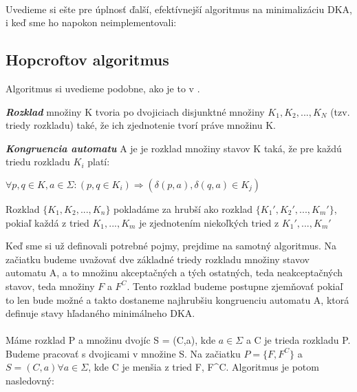 \paragraph{}
Uvedieme si ešte pre úplnosť ďalší, efektívnejší algoritmus na minimalizáciu DKA, i keď sme ho napokon neimplementovali:

\subsection{Hopcroftov algoritmus}
Algoritmus si uvedieme podobne, ako je to v \cite{petruchova}.
\begin{defn}{\textbf {\textit {Rozklad}}} množiny K tvoria po dvojiciach disjunktné množiny $K_1,K_2,...,K_N$ (tzv. triedy rozkladu) také, že ich zjednotenie tvorí práve množinu K. \end{defn}

\begin{defn}{\textbf {\textit {Kongruencia automatu}}} A je je rozklad množiny stavov K taká, že pre každú triedu rozkladu $K_i$ platí:
\\
\centerline{$\forall p,q \in K, a \in \Sigma: (p,q \in K_i) \Rightarrow (\delta(p,a),\delta(q,a) \in K_j)$}
\end{defn}

\begin{defn}Rozklad $\{K_1,K_2,...,K_n\}$ pokladáme za hrubší ako rozklad $\{K_1',K_2',...,K_m'\}$, pokiaľ každá z tried $K_1,...,K_m$ je zjednotením niekoľkých tried z $K_1',...,K_m'$ \end{defn}

Keď sme si už definovali potrebné pojmy, prejdime na samotný algoritmus. Na začiatku budeme uvažovať dve základné triedy rozkladu množiny stavov automatu A, a to množinu akceptačných a tých ostatných, teda neakceptačných stavov, teda množiny $F$ a $F^C$. Tento rozklad budeme postupne zjemňovať pokiaľ to len bude možné a takto dostaneme najhrubšiu kongruenciu automatu A, ktorá definuje stavy hľadaného minimálneho DKA.

\paragraph{}
Máme rozklad P a množinu dvojíc S = (C,a), kde $a \in \Sigma$ a C je trieda rozkladu P. Budeme pracovať s dvojicami v množine S. Na začiatku $P=\{F,F^C\}$ a $S = (C,a) \forall a \in \Sigma$, kde C je menšia z tried F, F^C. Algoritmus je potom nasledovný:

